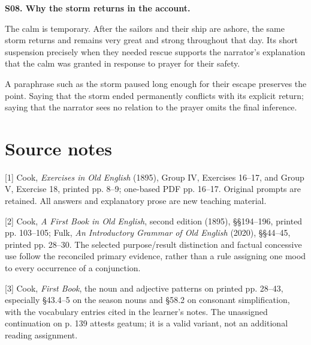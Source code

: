 \par\begin{minipage}{\linewidth}\raggedright
\textbf{S08. Why the storm returns in the account.}

The calm is temporary. After the sailors and their ship are ashore, the same storm returns and remains very great and strong throughout that day. Its short suspension precisely when they needed rescue supports the narrator's explanation that the calm was granted in response to prayer for their safety.

A paraphrase such as the storm paused long enough for their escape preserves the point. Saying that the storm ended permanently conflicts with its explicit return; saying that the narrator sees no relation to the prayer omits the final inference.

\end{minipage}\par\addvspace{4pt}

\clearpage
\section*{Source notes}

\begingroup\fontsize{10}{12.8}\selectfont
[1] Cook, \emph{Exercises in Old English} (1895), Group IV, Exercises 16–17, and Group V, Exercise 18, printed pp. 8–9; one-based PDF pp. 16–17. Original prompts are retained. All answers and explanatory prose are new teaching material.

[2] Cook, \emph{A First Book in Old English}, second edition (1895), §§194–196, printed pp. 103–105; Fulk, \emph{An Introductory Grammar of Old English} (2020), §§44–45, printed pp. 28–30. The selected purpose/\allowbreak{}result distinction and factual concessive use follow the reconciled primary evidence, rather than a rule assigning one mood to every occurrence of a conjunction.

[3] Cook, \emph{First Book}, the noun and adjective patterns on printed pp. 28–43, especially §43.4–5 on the season nouns and §58.2 on consonant simplification, with the vocabulary entries cited in the learner's notes. The unassigned continuation on p. 139 attests geatum; it is a valid variant, not an additional reading assignment.

